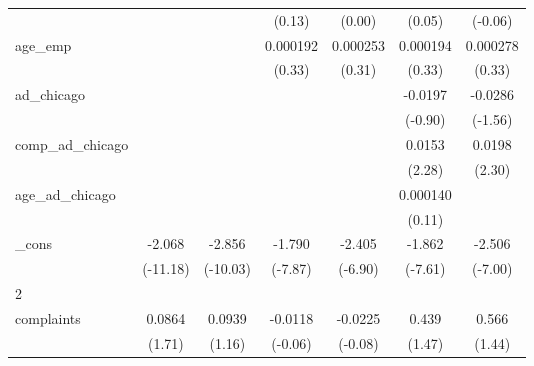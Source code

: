 {\begin{tabular}{l*{6}{c}}
            &                     &                     &      (0.13)         &      (0.00)         &      (0.05)         &     (-0.06)         \\
[1em]
age\_emp     &                     &                     &    0.000192         &    0.000253         &    0.000194         &    0.000278         \\
            &                     &                     &      (0.33)         &      (0.31)         &      (0.33)         &      (0.33)         \\
[1em]
ad\_chicago  &                     &                     &                     &                     &     -0.0197         &     -0.0286         \\
            &                     &                     &                     &                     &     (-0.90)         &     (-1.56)         \\
[1em]
comp\_ad\_chicago&                     &                     &                     &                     &      0.0153\sym{*}  &      0.0198\sym{*}  \\
            &                     &                     &                     &                     &      (2.28)         &      (2.30)         \\
[1em]
age\_ad\_chicago&                     &                     &                     &                     &    0.000140         &                     \\
            &                     &                     &                     &                     &      (0.11)         &                     \\
[1em]
\_cons      &      -2.068\sym{***}&      -2.856\sym{***}&      -1.790\sym{***}&      -2.405\sym{***}&      -1.862\sym{***}&      -2.506\sym{***}\\
            &    (-11.18)         &    (-10.03)         &     (-7.87)         &     (-6.90)         &     (-7.61)         &     (-7.00)         \\
\hline
2           &                     &                     &                     &                     &                     &                     \\
complaints  &      0.0864         &      0.0939         &     -0.0118         &     -0.0225         &       0.439         &       0.566         \\
            &      (1.71)         &      (1.16)         &     (-0.06)         &     (-0.08)         &      (1.47)         &      (1.44)         \\

\end{tabular}}
